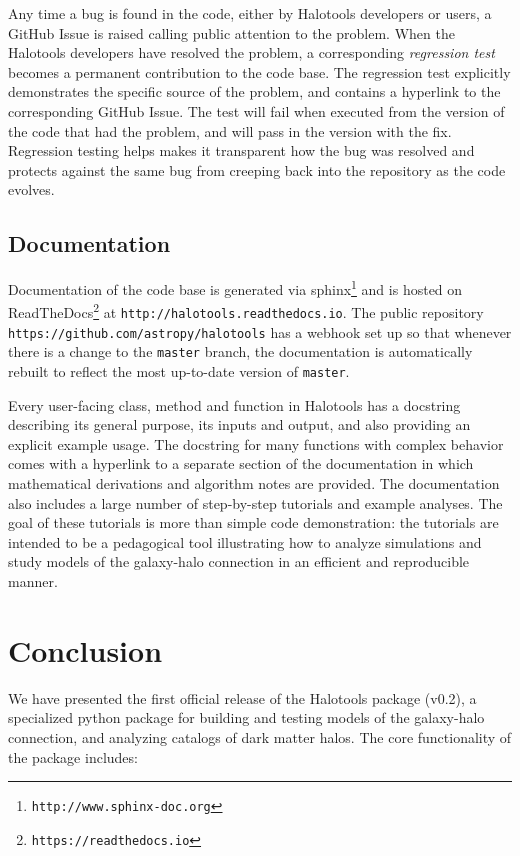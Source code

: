 \documentclass[twocolumn, tighten]{aastex6}
\begin{document}
Any time a bug is found in the code, either by Halotools developers or users, a GitHub Issue is raised calling public attention to the problem. When the Halotools developers have resolved the problem, a corresponding {\em regression test} becomes a permanent contribution to the code base. The regression test explicitly demonstrates the specific source of the problem, and contains a hyperlink to the corresponding GitHub Issue. The test will fail when executed from the version of the code that had the problem, and will pass in the version with the fix. Regression testing helps makes it transparent how the bug was resolved and protects against the same bug from creeping back into the repository as the code evolves. 

\subsection{Documentation}
\label{subsection:documentation}

Documentation of the code base is generated via sphinx\footnote{\tt http://www.sphinx-doc.org} and is hosted on ReadTheDocs\footnote{\tt https://readthedocs.io} at {\tt http://halotools.readthedocs.io}. The public repository {\tt https://github.com/astropy/halotools} has a webhook set up so that whenever there is a change to the {\tt master} branch, the documentation is automatically rebuilt to reflect the most up-to-date version of {\tt master}. 

Every user-facing class, method and function in Halotools has a docstring describing its general purpose, its inputs and output, and also providing an explicit example usage. The docstring for many functions with complex behavior comes with a hyperlink to a separate section of the documentation in which mathematical derivations and algorithm notes are provided. The documentation also includes a large number of step-by-step tutorials and example analyses. The goal of these tutorials is more than simple code demonstration: the tutorials are intended to be a pedagogical tool illustrating how to analyze simulations and study models of the galaxy-halo connection in an efficient and reproducible manner. 

\section{Conclusion}
\label{section:conclusion}

We have presented the first official release of the Halotools package (v0.2), a specialized python package for building and testing models of the galaxy-halo connection, and analyzing catalogs of dark matter halos. The core functionality of the package includes:
\end{document}
